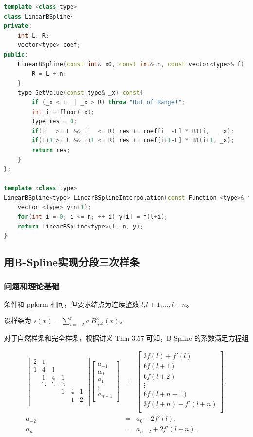 \documentclass{ctexart}
\begin{document}
\begin{lstlisting}[language={c++}]
template <class type>
class LinearBSpline{
private:
	int L, R;
	vector<type> coef;
public:
	LinearBSpline(const int& x0, const int& n, const vector<type>& f) : L(x0), coef(f) {
		R = L + n;
	}
	type GetValue(const type& _x) const{
		if (_x < L || _x > R) throw "Out of Range!";
		int i = floor(_x);
		type res = 0;
		if(i   >= L && i   <= R) res += coef[i  -L] * B1(i,   _x);
		if(i+1 >= L && i+1 <= R) res += coef[i+1-L] * B1(i+1, _x);
		return res;
	}
};

template <class type>
LinearBSpline<type> LinearBSplineInterpolation(const Function <type>& f, const int& l, const int& n) {
	vector <type> y(n+1);
	for(int i = 0; i <= n; ++ i) y[i] = f(l+i);
	return LinearBSpline<type>(l, n, y);
}
\end{lstlisting}

\subsection{用B-Spline实现分段三次样条}

\subsubsection{问题和理论基础}
条件和 ppform 相同，但要求结点为连续整数 $l,l+1,\dots,l+n$。

设样条为 $s(x)=\sum_{i=-2}^na_iB_{i,\mathbb{Z}}^3(x)$。

对于自然样条和完全样条，根据讲义 Thm 3.57 可知，B-Spline 的系数满足方程组

\begin{equation}
\begin{aligned}
\begin{bmatrix}
2 & 1 & & & & \\
1 & 4 & 1 & & & \\
& 1 & 4 & 1 & \\
& \ddots & \ddots & \ddots & \\
& & & 1 & 4 & 1 \\
& & & & 1 & 2\\
\end{bmatrix}
\begin{bmatrix}
a_{-1}\\
a_0\\
a_1\\
\vdots\\
a_{n-1}\\
\end{bmatrix}
&=&
\begin{bmatrix}
3f(l)+f'(l)\\
6f(l+1)\\
6f(l+2)\\
\vdots\\
6f(l+n-1)\\
3f(l+n)-f'(l+n)\\
\end{bmatrix},\\
a_{-2}&=&a_0-2f'(l),\\
a_n&=&a_{n-2}+2f'(l+n).
\end{aligned}
\end{equation}
\end{document}
